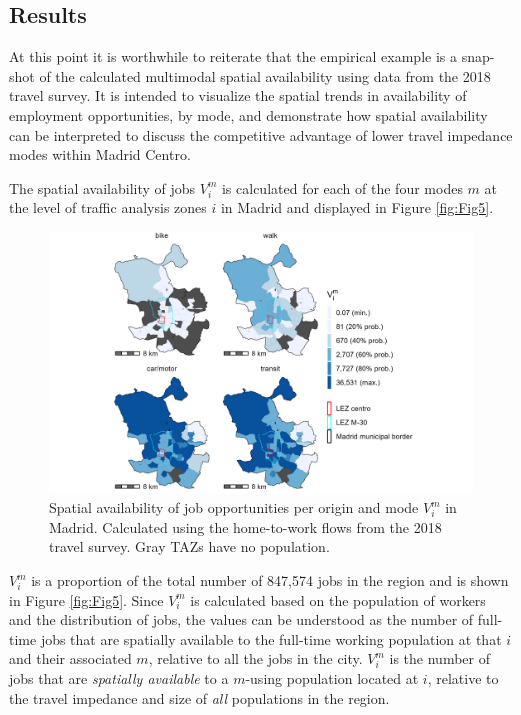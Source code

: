 \documentclass[10pt,letterpaper]{article}
\begin{document}
\hypertarget{results}{%
\subsection{Results}\label{results}}

At this point it is worthwhile to reiterate that the empirical example
is a snap-shot of the calculated multimodal spatial availability using
data from the 2018 travel survey. It is intended to visualize the
spatial trends in availability of employment opportunities, by mode, and
demonstrate how spatial availability can be interpreted to discuss the
competitive advantage of lower travel impedance modes within Madrid
Centro.

The spatial availability of jobs \(V_i^m\) is calculated for each of the
four modes \(m\) at the level of traffic analysis zones \(i\) in Madrid
and displayed in Figure \ref{fig:Fig5}.

\begin{figure}

{\centering \includegraphics[width=1\linewidth]{images/SA_im_V_zn208_plot} 

}

\caption{\label{fig:Fig5} Spatial availability of job opportunities per origin and mode $V_i^m$ in Madrid. Calculated using the home-to-work flows from the 2018 travel survey. Gray TAZs have no population.}\label{fig:SA-m-plot}
\end{figure}

\(V_i^m\) is a proportion of the total number of 847,574 jobs in the
region and is shown in Figure \ref{fig:Fig5}. Since \(V_i^m\) is
calculated based on the population of workers and the distribution of
jobs, the values can be understood as the number of full-time jobs that
are spatially available to the full-time working population at that
\(i\) and their associated \(m\), relative to all the jobs in the city.
\(V_i^m\) is the number of jobs that are \emph{spatially available} to a
\(m\)-using population located at \(i\), relative to the travel
impedance and size of \emph{all} populations in the region.
\end{document}
